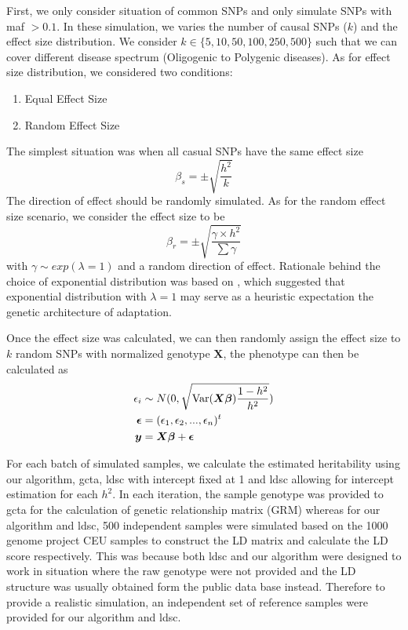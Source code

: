 		
		First, we only consider situation of common \glspl{SNP} and only simulate \glspl{SNP} with \gls{maf} $> 0.1$.
		In these simulation, we varies the number of causal \glspl{SNP} ($k$) and the effect size distribution.
		We consider $k\in\{5, 10, 50, 100, 250, 500\}$ such that we can cover different disease spectrum (Oligogenic to Polygenic diseases). 
		As for effect size distribution, we considered two conditions:
		\begin{enumerate}
			\item Equal Effect Size
			\item Random Effect Size
		\end{enumerate}
		The simplest situation was when all casual \glspl{SNP} have the same effect size 
		\begin{equation}
		\beta_s=\pm\sqrt{\frac{h^2}{k}}
		\label{eq:stableEffect}
		\end{equation}
		The direction of effect should be randomly simulated.
		As for the random effect size scenario, we consider the effect size to be 
		\begin{equation}
		\beta_r=\pm\sqrt{\frac{\gamma \times h^2}{\sum \gamma}}
		\label{eq:randomEffect}
		\end{equation}
		with $\gamma\sim exp(\lambda=1)$ and a random direction of effect.
		Rationale behind the choice of exponential distribution was based on \citet{Orr1998}, which suggested that exponential distribution with $\lambda=1$ may serve as a heuristic expectation the genetic architecture of adaptation.

		Once the effect size was calculated, we can then randomly assign the effect size to $k$ random \glspl{SNP} with normalized genotype $\boldsymbol{X}$, the phenotype can then be calculated as 
		\begin{align}
		\epsilon_i&\sim N(0,\sqrt{\mathrm{Var}(\boldsymbol{X\beta})\frac{1-h^2}{h^2}} )\notag\\
		\boldsymbol{\epsilon} &= (\epsilon_1,\epsilon_2,...,\epsilon_n)^t\notag\\
		\boldsymbol{y} &= \boldsymbol{X\beta}+\boldsymbol{\epsilon}
		\label{eq:simulationOfPhenotype}
		\end{align}
		
		For each batch of simulated samples, we calculate the estimated heritability using our algorithm, \gls{gcta}, \gls{ldsc} with intercept fixed at 1 and \gls{ldsc} allowing for intercept estimation for each $h^2$.
		In each iteration, the sample genotype was provided to \gls{gcta} for the calculation of genetic relationship matrix (GRM) whereas for our algorithm and \gls{ldsc}, 500 independent samples were simulated based on the 1000 genome project \gls{CEU} samples\parencite{Project2012} to construct the \gls{LD} matrix and calculate the \gls{LD} score respectively.
		This was because both \gls{ldsc} and our algorithm were designed to work in situation where the raw genotype were not provided and the \gls{LD} structure was usually obtained form the public data base instead.
		Therefore to provide a realistic simulation, an independent set of reference samples were provided for our algorithm and \gls{ldsc}.
		
